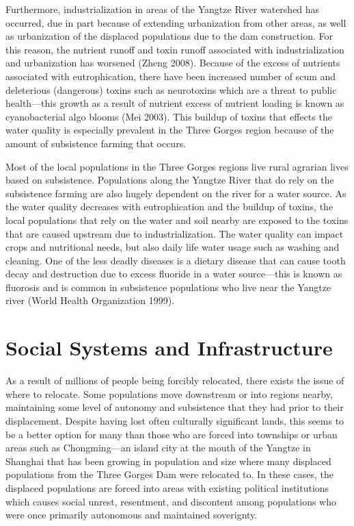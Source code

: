 \documentclass{book}\usepackage{knitr}
\begin{document}
  Furthermore, industrialization in areas of the Yangtze River watershed has occurred, due in part because of extending urbanization from other areas, as well as urbanization of the displaced populations due to the dam construction. For this reason, the nutrient runoff and toxin runoff associated with industrialization and urbanization has worsened (Zheng 2008). Because of the excess of nutrients associated with eutrophication, there have been increased number of scum and deleterious (dangerous) toxins such as neurotoxins which are a threat to public health—this growth as a result of nutrient excess of nutrient loading is known as cyanobacterial algo blooms (Mei 2003). This buildup of toxins that effects the water quality is especially prevalent in the Three Gorges region because of the amount of subsistence farming that occurs. 
  
  Most of the local populations in the Three Gorges regions live rural agrarian lives based on subsistence. Populations along the Yangtze River that do rely on the subsistence farming are also hugely dependent on the river for a water source. As the water quality decreases with eutrophication and the buildup of toxins, the local populations that rely on the water and soil nearby are exposed to the toxins that are caused upstream due to industrialization. The water quality can impact crops and nutritional needs, but also daily life water usage such as washing and cleaning. One of the less deadly diseases is a dietary disease that can cause tooth decay and destruction due to excess fluoride in a water source—this is known as fluorosis and is common in subsistence populations who live near the Yangtze river (World Health Organization 1999).
  
\section{Social Systems and Infrastructure}
  As a result of millions of people being forcibly relocated, there exists the issue of where to relocate. Some populations move downstream or into regions nearby, maintaining some level of autonomy and subsistence that they had prior to their displacement. Despite having lost often culturally significant lands, this seems to be a better option for many than those who are forced into townships or urban areas such as Chongming—an island city at the mouth of the Yangtze in Shanghai that has been growing in population and size where many displaced populations from the Three Gorges Dam were relocated to. In these cases, the displaced populations are forced into areas with existing political institutions which causes social unrest, resentment, and discontent among populations who were once primarily autonomous and maintained soverignty. 
  
\end{document}
